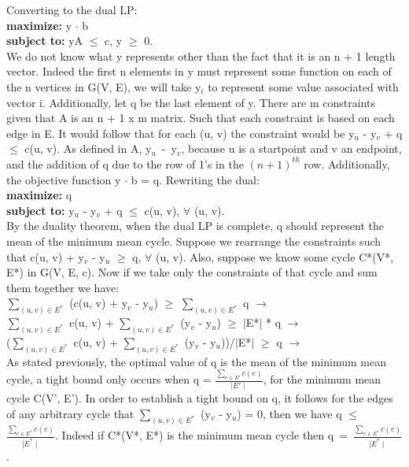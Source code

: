 \documentclass[10pt]{csc_assignment}
\begin{document}
\begin{description}
Converting to the dual LP:\\
\textbf{maximize:} y $\cdot$ b\\
\textbf{subject to:} yA $\leqslant$ c, y $\geqslant$ 0.\\
We do not know what y represents other than the fact that it is an n + 1 length vector. Indeed the first n elements in y must represent some function on each of the n vertices in G(V, E), we will take y$_{i}$ to represent some value associated with vector i. Additionally, let q be the last element of y. There are m constraints given that A is an n + 1 x m matrix. Such that each constraint is based on each edge in E. It would follow that for each (u, v) the constraint would be y$_{u}$ - y$_{v}$ + q $\leqslant$ c(u, v). As defined in A, \mbox{y$_{u}$ - y$_{v}$}, because u is a startpoint and v an endpoint, and the addition of q due to the row of 1's in the $(n+1)^{th}$ row. Additionally, the objective function y $\cdot$ b = q. Rewriting the dual:\\
\textbf{maximize:} q\\
\textbf{subject to:} y$_{u}$ - y$_{v}$ + q $\leqslant$ c(u, v), $\forall$ (u, v).\\

By the duality theorem, when the dual LP is complete, q should represent the mean of the minimum mean cycle. Suppose we rearrange the constraints such that c(u, v) + y$_{v}$ - y$_{u}$ $\geqslant$ q, $\forall$ (u, v). Also, suppose we know  some cycle C*(V*, E*) in G(V, E, c). Now if we take only the constraints of that cycle and sum them together we have:\\
$\sum_{(u, v) \in E^{*}}$ (c(u, v) + y$_{v}$ - y$_{u}$) $\geqslant$ $\sum_{(u, v) \in E^{*}}$ q $\rightarrow$\\
$\sum_{(u, v) \in E^{*}}$ c(u, v) + $\sum_{(u, v) \in E^{*}}$ (y$_{v}$ - y$_{u}$) $\geqslant$ $\mid$E*$\mid$ * q $\rightarrow$\\
($\sum_{(u, v) \in E^{*}}$ c(u, v) + $\sum_{(u, v) \in E^{*}}$ (y$_{v}$ - y$_{u}$))/$\mid$E*$\mid$ $\geqslant$ q $\rightarrow$\\
As stated previously, the optimal value of q is the mean of the minimum mean cycle, a tight bound only occurs when q = $\frac{\sum_{e \in E'} c(e)}{\mid E' \mid}$, for the minimum mean cycle C(V', E'). In order to establish a tight bound on q, it follows for the edges of any arbitrary cycle that $\sum_{(u, v) \in E^{*}}$ (y$_{v}$ - y$_{u}$) = 0, then we have q $\leqslant$ $\frac{\sum_{e \in E^{*}} c(e)}{\mid E^{*} \mid}$. Indeed if C*(V*, E*) is the minimum mean cycle then \mbox{q = $\frac{\sum_{e \in E^{*}} c(e)}{\mid E^{*} \mid}$}.




\end{description}
\end{document}
